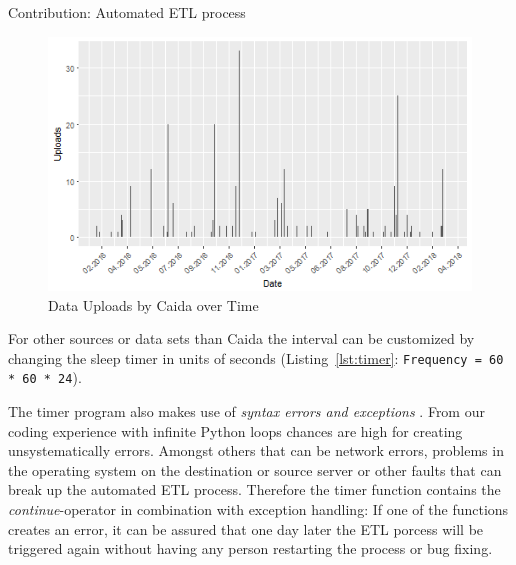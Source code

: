 \documentclass[conference, 11pt]{IEEEtran}
\begin{document}
\begin{subsection}{Contribution: Automated ETL process}
\vspace{0.2cm}
\begin{figure}[htbp]
\centerline{\includegraphics[scale=0.5]{Graphics/uploadFrequency.png}}
\caption{Data Uploads by Caida over Time}
\label{fig:UploadOverTime}
\end{figure}
\vspace{0.5cm}


 
For other sources or data sets than Caida the interval can be customized by changing the sleep timer in units of seconds (Listing~\ref{lst:timer}: \lstinline{Frequency = 60 * 60 * 24}).\linebreak


\vspace{0.3cm}
 \vspace{0.3cm}



The timer program also makes use of \textit{syntax errors and exceptions} \cite{PythonDocumentation}.
From our coding experience with infinite Python loops chances are high for creating unsystematically errors. Amongst others that can be network errors, problems in the operating system on the destination or source server or other faults that can break up the automated ETL process.
Therefore the timer function contains the \textit{continue}-operator in combination with exception handling: If one of the functions creates an error, it can be assured that one day later the ETL porcess will be triggered again without having any person restarting the process or bug fixing. \linebreak


\end{subsection}
\end{document}

